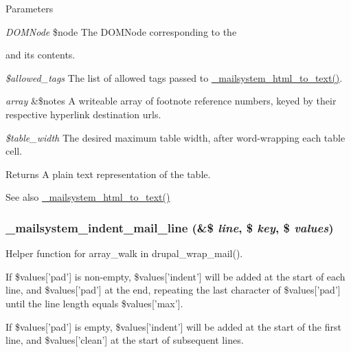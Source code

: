 \begin{DoxyParams}{Parameters}
\item[{\em DOMNode}]\$node The DOMNode corresponding to the \begin{TabularC}{0}
\hline
\end{TabularC}
and its contents. \item[{\em \$allowed\_\-tags}]The list of allowed tags passed to \hyperlink{html__to__text_8inc_af581a74a8de0f0cbedc673623bccdc5d}{\_\-mailsystem\_\-html\_\-to\_\-text()}. \item[{\em array}]\&\$notes A writeable array of footnote reference numbers, keyed by their respective hyperlink destination urls. \item[{\em \$table\_\-width}]The desired maximum table width, after word-\/wrapping each table cell.\end{DoxyParams}
\begin{DoxyReturn}{Returns}
A plain text representation of the table.
\end{DoxyReturn}
\begin{DoxySeeAlso}{See also}
\hyperlink{html__to__text_8inc_af581a74a8de0f0cbedc673623bccdc5d}{\_\-mailsystem\_\-html\_\-to\_\-text()} 
\end{DoxySeeAlso}
\hypertarget{html__to__text_8inc_ad77a7dffe89d0b6cb337b0f36bdb64b3}{
\subsubsection[{\_\-mailsystem\_\-indent\_\-mail\_\-line}]{\setlength{\rightskip}{0pt plus 5cm}\_\-mailsystem\_\-indent\_\-mail\_\-line (\&\$ {\em line}, \/  \$ {\em key}, \/  \$ {\em values})}}
\label{html__to__text_8inc_ad77a7dffe89d0b6cb337b0f36bdb64b3}
Helper function for array\_\-walk in drupal\_\-wrap\_\-mail().

If \$values\mbox{[}'pad'\mbox{]} is non-\/empty, \$values\mbox{[}'indent'\mbox{]} will be added at the start of each line, and \$values\mbox{[}'pad'\mbox{]} at the end, repeating the last character of \$values\mbox{[}'pad'\mbox{]} until the line length equals \$values\mbox{[}'max'\mbox{]}.

If \$values\mbox{[}'pad'\mbox{]} is empty, \$values\mbox{[}'indent'\mbox{]} will be added at the start of the first line, and \$values\mbox{[}'clean'\mbox{]} at the start of subsequent lines.

